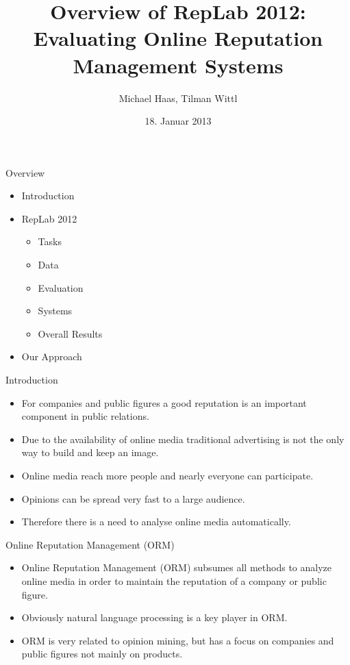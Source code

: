 \documentclass[12pt,a4paper]{beamer}
\author{Michael Haas, Tilman Wittl}
\title{Overview of RepLab 2012: Evaluating Online
Reputation Management Systems
}
\date{18. Januar 2013}
\begin{document}
\begin{frame}
\maketitle
\end{frame}

\begin{frame}{Overview}
\begin{itemize}
\item Introduction
\item RepLab 2012
\begin{itemize}
\item Tasks
\item Data
\item Evaluation
\item Systems
\item Overall Results
\end{itemize}
\item Our Approach
\end{itemize}
\end{frame}

\begin{frame}{Introduction}
\begin{itemize}
\item For companies and public figures a good reputation is an important component in public relations.
\item Due to the availability of online media traditional advertising is not the only way to build and keep an image.
\item Online media reach more people and nearly everyone can participate.
\item Opinions can be spread very fast to a large audience.
\item Therefore there is a need to analyse online media automatically.
\end{itemize}
\end{frame}
\begin{frame}{Online Reputation Management (ORM)}
\begin{itemize}
\item Online Reputation Management (ORM) subsumes all methods to analyze online media in order to maintain the reputation of a company or public figure.
\item Obviously natural language processing is a key player in ORM.
\item ORM is very related to opinion mining, but has a focus on companies and public figures not mainly on products.
\end{itemize}
\end{frame}
\end{document}

